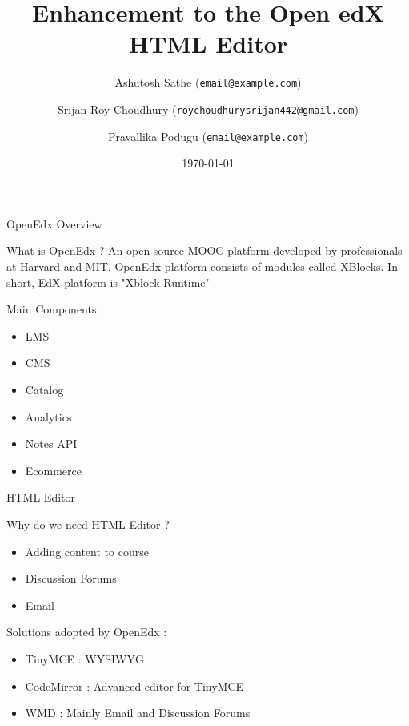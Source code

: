 \documentclass{beamer}
\title{Enhancement to the Open edX HTML Editor}
\date{\today}
\author{
	Ashutosh Sathe
	(\texttt{email@example.com}) \\
	\and
	Srijan Roy Choudhury
	(\texttt{roychoudhurysrijan442@gmail.com}) \\
	\and
	Pravallika Podugu
	(\texttt{email@example.com}) \\
}
\begin{document}
	\maketitle

	\begin{frame}{OpenEdx Overview}
		\begin{block}{What is OpenEdx ?}
			An open source MOOC platform developed by professionals at Harvard and MIT.
			OpenEdx platform consists of modules called XBlocks. In short, EdX platform is "Xblock Runtime"
		\end{block}
		\begin{block}{Main Components : }
			\begin{itemize}
				\item LMS
				\item CMS
				\item Catalog
				\item Analytics
				\item Notes API
				\item Ecommerce
			\end{itemize}
		\end{block}
	\end{frame}
	
	\begin{frame}{ HTML Editor }
		\begin{block}{Why do we need HTML Editor ?}
			\begin{itemize}
				\item Adding content to course
				\item Discussion Forums
				\item Email
			\end{itemize}
		\end{block}
		\begin{block}{Solutions adopted by OpenEdx : }
			\begin{itemize}
				\item TinyMCE : WYSIWYG
				\item CodeMirror : Advanced editor for TinyMCE
				\item WMD : Mainly Email and Discussion Forums
			\end{itemize}
		\end{block}
	\end{frame}
	
\end{document}
